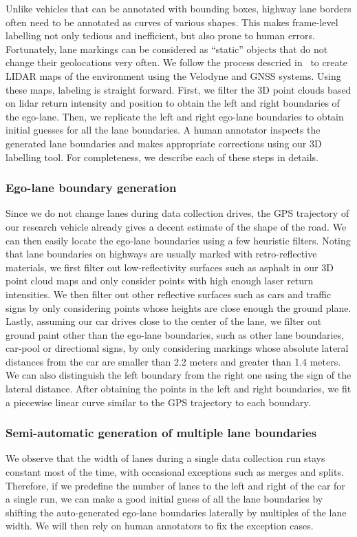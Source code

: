 \documentclass[journal]{IEEEtran}
\begin{document}
Unlike vehicles that can be annotated with bounding boxes, highway lane borders often need to be annotated as curves of various shapes. This makes frame-level labelling not only tedious and inefficient, but also prone to human errors. Fortunately, lane markings can be considered as “static” objects that do not change their geolocations very often. We follow the process descried in~\cite{levinson-2011} to create LIDAR maps of the environment using the Velodyne and GNSS systems. Using these maps, labeling is straight forward. First, we filter the 3D point clouds based on lidar return intensity and position to obtain the left and right boundaries of the ego-lane. Then, we replicate the left and right ego-lane boundaries to obtain initial guesses for all the lane boundaries. A human annotator inspects the generated lane boundaries and makes appropriate corrections using our 3D labelling tool. For completeness, we describe each of these steps in details.
 
\subsubsection{Ego-lane boundary generation}
Since we do not change lanes during data collection drives, the GPS trajectory of our research vehicle already gives a decent estimate of the shape of the road. We can then easily locate the ego-lane boundaries using a few heuristic filters. Noting that lane boundaries on highways are usually marked with retro-reflective materials, we first filter out low-reflectivity surfaces such as asphalt in our 3D point cloud maps and only consider points with high enough laser return intensities. We then filter out other reflective surfaces such as cars and traffic signs by only considering points whose heights are close enough the ground plane.  Lastly, assuming our car drives close to the center of the lane, we filter out ground paint other than the ego-lane boundaries, such as other lane boundaries, car-pool or directional signs, by only considering markings whose absolute lateral distances from the car are smaller than 2.2 meters and greater than 1.4 meters. We can also distinguish the left boundary from the right one using the sign of the lateral distance. After obtaining the points in the left and right boundaries, we fit a piecewise linear curve similar to the GPS trajectory to each boundary.
 
\subsubsection{Semi-automatic generation of multiple lane boundaries}
We observe that the width of lanes during a single data collection run stays constant most of the time, with occasional exceptions such as merges and splits. Therefore, if we predefine the number of lanes to the left and right of the car for a single run, we can make a good initial guess of all the lane boundaries by shifting the auto-generated ego-lane boundaries laterally by multiples of the lane width. We will then rely on human annotators to fix the exception cases.
 
\end{document}
